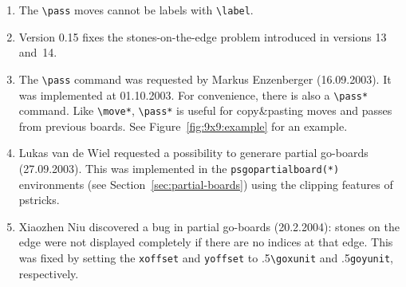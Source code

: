 \documentclass[a4paper]{article}
\begin{document}
\begin{enumerate}

\item The \verb|\pass| moves cannot be labels with \verb|\label|.

\item Version 0.15 fixes the stones-on-the-edge problem introduced in
  versions 13 and~14.

\item The \verb|\pass| command was requested by Markus Enzenberger
  (16.09.2003). It was implemented at 01.10.2003. For convenience,
  there is also a \verb|\pass*| command. Like \verb|\move*|,
  \verb|\pass*| is useful for copy\&pasting moves and passes from
  previous boards. See Figure~\ref{fig:9x9:example} for an example.

\item Lukas van de Wiel requested a possibility to generare partial
go-boards (27.09.2003). This was implemented in the
\texttt{psgopartialboard(*)} environments (see
Section~\ref{sec:partial-boards}) using the clipping features of
\textsf{pstricks}.

\item Xiaozhen Niu discovered a bug in partial go-boards (20.2.2004):
stones on the edge were not displayed completely if there are no
indices at that edge. This was fixed by setting the \verb+xoffset+ and
\verb+yoffset+ to .5\verb+\goxunit+ and .5\verb+goyunit+,
respectively.


\end{enumerate}
\end{document}
